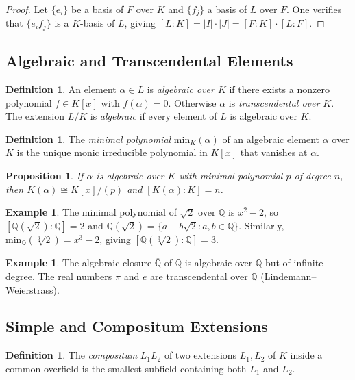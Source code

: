 \documentclass[12pt,a4paper]{amsart}
\newtheorem{proposition}[theorem]{Proposition}
\theoremstyle{definition}
\newtheorem{definition}[theorem]{Definition}
\newtheorem{example}[theorem]{Example}
\newcommand{\Q}{\mathbb{Q}}
\begin{document}
\begin{proof}
Let $\{e_i\}$ be a basis of $F$ over $K$ and $\{f_j\}$ a basis of $L$ over
$F$. One verifies that $\{e_i f_j\}$ is a $K$-basis of $L$, giving
$[L:K] = |I| \cdot |J| = [F:K] \cdot [L:F]$.
\end{proof}

\subsection{Algebraic and Transcendental Elements}

\begin{definition}
An element $\alpha \in L$ is \emph{algebraic over $K$} if there exists a
nonzero polynomial $f \in K[x]$ with $f(\alpha) = 0$. Otherwise $\alpha$ is
\emph{transcendental over $K$}. The extension $L/K$ is \emph{algebraic} if
every element of $L$ is algebraic over $K$.
\end{definition}

\begin{definition}
The \emph{minimal polynomial} $\mathrm{min}_{K}(\alpha)$ of an algebraic
element $\alpha$ over $K$ is the unique monic irreducible polynomial in $K[x]$
that vanishes at $\alpha$.
\end{definition}

\begin{proposition}
If $\alpha$ is algebraic over $K$ with minimal polynomial $p$ of degree $n$,
then $K(\alpha) \cong K[x]/(p)$ and $[K(\alpha):K] = n$.
\end{proposition}

\begin{example}
The minimal polynomial of $\sqrt{2}$ over $\Q$ is $x^2 - 2$, so
$[\Q(\sqrt{2}):\Q] = 2$ and $\Q(\sqrt{2}) = \{a + b\sqrt{2} : a,b \in \Q\}$.
Similarly, $\mathrm{min}_\Q(\sqrt[3]{2}) = x^3 - 2$, giving
$[\Q(\sqrt[3]{2}):\Q] = 3$.
\end{example}

\begin{example}
The algebraic closure $\overline{\Q}$ of $\Q$ is algebraic over $\Q$ but of
infinite degree. The real numbers $\pi$ and $e$ are transcendental over $\Q$
(Lindemann--Weierstrass).
\end{example}

\subsection{Simple and Compositum Extensions}

\begin{definition}
The \emph{compositum} $L_1 L_2$ of two extensions $L_1, L_2$ of $K$ inside
a common overfield is the smallest subfield containing both $L_1$ and $L_2$.
\end{definition}
\end{document}
